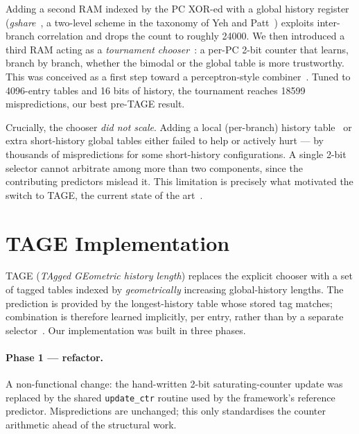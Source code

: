\documentclass[11pt]{article}
\newcommand{\code}[1]{\texttt{\small #1}}
\begin{document}
Adding a second RAM indexed by the PC XOR-ed with a global history register
(\emph{gshare}~\cite{mcfarling1993}, a two-level scheme in the taxonomy of Yeh
and Patt~\cite{yehpatt1992}) exploits inter-branch correlation and drops the
count to roughly \num{24000}. We then introduced a third RAM acting as a
\emph{tournament chooser}~\cite{mcfarling1993}: a per-PC 2-bit counter that
learns, branch by branch, whether the bimodal or the global table is more
trustworthy. This was conceived as a first step toward a perceptron-style
combiner~\cite{jimenez2001}. Tuned to 4096-entry tables and 16 bits of history,
the tournament reaches \num{18599} mispredictions, our best pre-TAGE result.

Crucially, the chooser \emph{did not scale}. Adding a local (per-branch) history
table~\cite{yehpatt1991} or extra short-history global tables either failed to
help or actively hurt --- by thousands of mispredictions for some
short-history configurations. A single 2-bit selector cannot arbitrate among
more than two components, since the contributing predictors mislead it. This
limitation is precisely what motivated the switch to TAGE, the current state of
the art~\cite{seznec2006,seznec2016}.

\section{TAGE Implementation}
TAGE (\emph{TAgged GEometric history length}) replaces the explicit chooser with
a set of tagged tables indexed by \emph{geometrically} increasing global-history
lengths. The prediction is provided by the longest-history table whose stored
tag matches; combination is therefore learned implicitly, per entry, rather
than by a separate selector~\cite{seznec2006}. Our implementation was built in
three phases.

\paragraph{Phase 1 --- refactor.}
A non-functional change: the hand-written 2-bit saturating-counter update was
replaced by the shared \code{update\_ctr} routine used by the framework's
reference predictor. Mispredictions are unchanged; this only standardises the
counter arithmetic ahead of the structural work.
\end{document}
